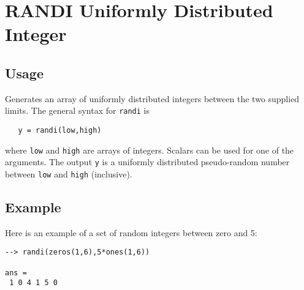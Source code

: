 \section{RANDI Uniformly Distributed Integer}

\subsection{Usage}

Generates an array of uniformly distributed integers between
the two supplied limits.  The general syntax for \verb|randi| is
\begin{verbatim}
   y = randi(low,high)
\end{verbatim}
where \verb|low| and \verb|high| are arrays of integers.  Scalars
can be used for one of the arguments.  The output \verb|y| is
a uniformly distributed pseudo-random number between \verb|low|
and \verb|high| (inclusive).
\subsection{Example}

Here is an example of a set of random integers between 
zero and 5:
\begin{verbatim}
--> randi(zeros(1,6),5*ones(1,6))

ans = 
 1 0 4 1 5 0 
\end{verbatim}
